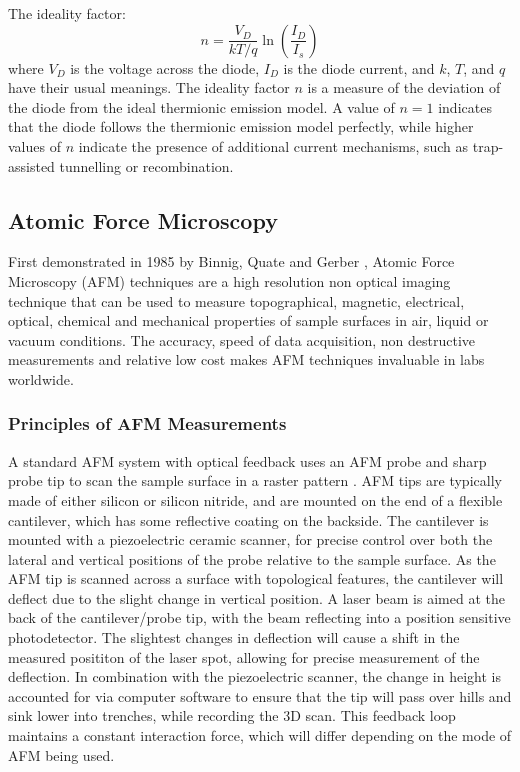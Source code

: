 The ideality factor:
\begin{equation}
    n = \frac{V_D}{kT/q}\ln\left(\frac{I_D}{I_s}\right)
    \label{eq:ideality_factor_thermionic}
\end{equation}
where $V_D$ is the voltage across the diode, $I_D$ is the diode current, and $k$, $T$, and $q$ have their usual meanings. The ideality factor $n$ is a measure of the deviation of the diode from the ideal thermionic emission model. A value of $n = 1$ indicates that the diode follows the thermionic emission model perfectly, while higher values of $n$ indicate the presence of additional current mechanisms, such as trap-assisted tunnelling or recombination.

\subsection{Atomic Force Microscopy}
First demonstrated in 1985 by Binnig, Quate and Gerber \cite{binnig:1986}, Atomic Force Microscopy (AFM) techniques are a high resolution non optical imaging technique that can be used to measure topographical, magnetic, electrical, optical, chemical and mechanical properties of sample surfaces in air, liquid or vacuum conditions. The accuracy, speed of data acquisition, non destructive measurements and relative low cost makes AFM techniques invaluable in labs worldwide.
\subsubsection{Principles of AFM Measurements}
A standard AFM system with optical feedback uses an AFM probe and sharp probe tip to scan the sample surface in a raster pattern \cite{marti:1999}. AFM tips are typically made of either silicon or silicon nitride, and are mounted on the end of a flexible cantilever, which has some reflective coating on the backside. The cantilever is mounted with a piezoelectric ceramic scanner, for precise control over both the lateral and vertical positions of the probe relative to the sample surface. As the AFM tip is scanned across a surface with topological features, the cantilever will deflect due to the slight change in vertical position. A laser beam is aimed at the back of the cantilever/probe tip, with the beam reflecting into a position sensitive photodetector. The slightest changes in deflection will cause a shift in the measured posititon of the laser spot, allowing for precise measurement of the deflection. In combination with the piezoelectric scanner, the change in height is accounted for via computer software to ensure that the tip will pass over hills and sink lower into trenches, while recording the 3D scan. This feedback loop maintains a constant interaction force, which will differ depending on the mode of AFM being used.

